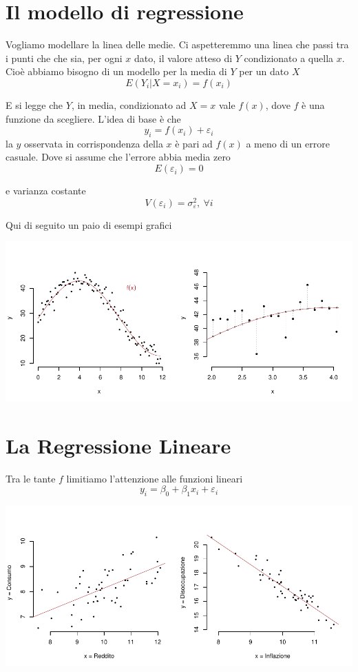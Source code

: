\documentclass[
  11pt,
]{book}
\theoremstyle{mytheoremstyle}
\theoremstyle{mydefstyle}
\begin{document}
\section{Il modello di regressione}\label{il-modello-di-regressione}

Vogliamo modellare la linea delle medie. Ci aspetteremmo una linea che passi tra i punti che
che sia, per ogni \(x\) dato, il valore atteso di \(Y\) condizionato a quella \(x\).
Cioè abbiamo bisogno di un modello per la media di \(Y\) per un dato \(X\)
\[E(Y_i|X=x_i)=f(x_i)\]

E si legge che \(Y\), in media, condizionato ad \(X=x\) vale \(f(x)\), dove \(f\) è una funzione da scegliere.
L'idea di base è che
\[y_i=f(x_i)+\varepsilon_i\]
la \(y\) osservata in corrispondenza della \(x\) è pari ad \(f(x)\) a meno di un errore casuale.
Dove si assume che l'errore abbia media zero
\[E(\varepsilon_i)=0\]

e varianza costante
\[V(\varepsilon_i)=\sigma^2_{\varepsilon}, ~\forall i\]

Qui di seguito un paio di esempi grafici

\begin{center}\includegraphics{Appunti_di_Statistica_2025_files/figure-latex/17-regressione-I-3-1} \end{center}

\section{La Regressione Lineare}\label{la-regressione-lineare}

Tra le tante \(f\) limitiamo l'attenzione alle funzioni lineari
\[y_i=\beta_0+\beta_1x_i+\varepsilon_i\]

\begin{center}\includegraphics{Appunti_di_Statistica_2025_files/figure-latex/17-regressione-I-5-1} \end{center}
\end{document}
